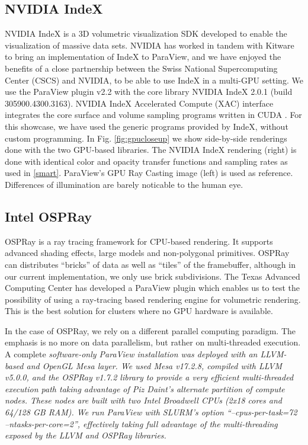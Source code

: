 \documentclass[5p,times]{elsarticle}
\begin{document}
\subsection{NVIDIA IndeX} \label{index}

NVIDIA IndeX \cite{NVIDIAIndeX} is a 3D volumetric visualization SDK developed to enable
the visualization of massive data sets. NVIDIA has worked in tandem with Kitware to
bring an implementation of IndeX to ParaView, and we have enjoyed the benefits
of a close partnership between the Swiss National Supercomputing Center (CSCS)
and NVIDIA, to be able to use IndeX in a multi-GPU setting. We use the ParaView
plugin v2.2 with the core library NVIDIA IndeX 2.0.1 (build 305900.4300.3163).
NVIDIA IndeX Accelerated Compute (XAC) interface integrates the core surface
and volume sampling programs written in CUDA \cite{SC18IndexShowcase}.
For this showcase, we have used the generic programs provided by IndeX, without custom programming.
In Fig. \ref{fig:gpucloseup} we show side-by-side renderings done with the
two GPU-based libraries. The NVIDIA IndeX rendering (right) is done with identical
color and opacity transfer functions and sampling rates as used in \ref{smart}. ParaView's
GPU Ray Casting image (left) is used as reference. Differences of
illumination are barely noticable to the human eye.

\subsection{Intel OSPRay}

OSPRay \cite{OSPRay} is a ray tracing framework for CPU-based rendering. It supports advanced 
shading effects, large models and non-polygonal primitives. OSPRay can distributes 
``bricks'' of data as well as ``tiles'' of the framebuffer, although in our current
implementation, we only use brick subdivisions. The Texas Advanced Computing Center
has developed a ParaView plugin which enables us to test the possibility of
using a ray-tracing based rendering engine for volumetric rendering. This is
the best solution for clusters where no GPU hardware is available.

In the case of OSPRay, we rely on a different parallel computing paradigm.
The emphasis is no more on data parallelism, but rather on multi-threaded execution.
A complete \it{software-only} \rm ParaView installation was deployed with an LLVM-based and
OpenGL Mesa layer. We used Mesa v17.2.8, compiled with LLVM v5.0.0, and the
OSPRay v1.7.2 library to provide a very efficient multi-threaded execution path
taking advantage of Piz Daint's alternate partition of compute nodes. These nodes
are built with two Intel Broadwell CPUs (2x18 cores and 64/128 GB RAM). We run
ParaView with SLURM's option ``--cpus-per-task=72 --ntasks-per-core=2'', effectively
taking full advantage of the multi-threading exposed by the LLVM and OSPRay libraries. 
\end{document}
